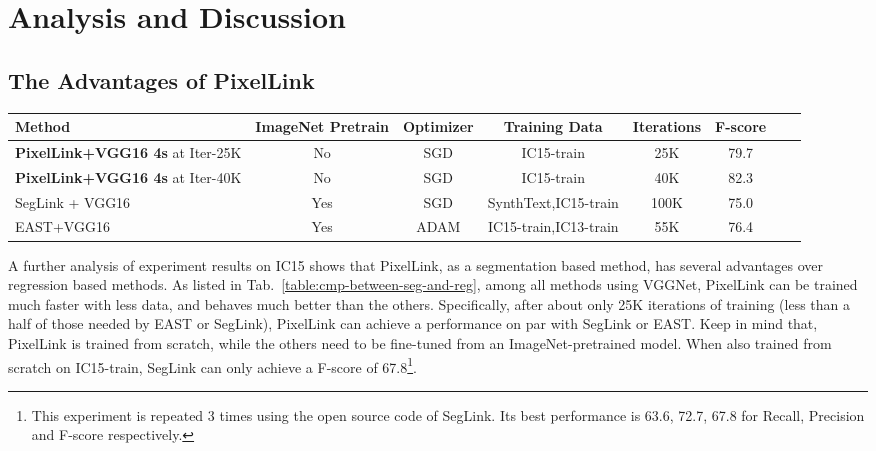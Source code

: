\documentclass[letterpaper]{article} \usepackage{aaai18}  \usepackage{times}  \usepackage{helvet}  \usepackage{courier}  \usepackage{url}  \usepackage{graphicx}
\begin{document}
	\section{Analysis and Discussion}
	\subsection{The Advantages of PixelLink}
	\label{sec:seg-vs-reg}
	\begin{table*}[!ht]
		\caption{Comparison of training speed and training data for IC15. SynthText~\cite{Gupta2016SynthText} is a synthetic dataset containing more than 0.8M images. All listed results for comparison are quoted from the corresponding original papers.}
		\label{table:cmp-between-seg-and-reg}
		\centering
		\begin{tabular}{|l|c|c|c|c|c|c|c|}
			\hline
			Method                          &ImageNet Pretrain  &Optimizer  &Training Data              &Iterations & F-score       \\
			\hline\hline
			\textbf{PixelLink+VGG16 4s} at Iter-25K  &No                     &SGD        &IC15-train                 &25K        &79.7   \\
			\hline
			\textbf{PixelLink+VGG16 4s} at Iter-40K  &No                     &SGD        &IC15-train                 &40K        &82.3   \\
			\hline
			SegLink + VGG16                 &Yes                    &SGD        &SynthText,IC15-train       &100K       &75.0   \\
			\hline
			EAST+VGG16                      &Yes                    &ADAM       &IC15-train,IC13-train      &55K             &76.4   \\
			\hline
		\end{tabular}
	\end{table*}
	A further analysis of experiment results on IC15 shows that PixelLink, as a segmentation based method, has several advantages over regression based methods.  As listed in  Tab.~\ref{table:cmp-between-seg-and-reg}, among all methods using VGGNet, PixelLink can be trained much faster with less data, and behaves much better than the others. Specifically, after about only 25K iterations of training (less than a half of those needed by EAST or SegLink), PixelLink can achieve a performance on par with SegLink or EAST. Keep in mind that, PixelLink is trained from scratch, while the others need to be fine-tuned from an ImageNet-pretrained model. When also trained from scratch on IC15-train, SegLink can only achieve a F-score of 67.8\footnote{This experiment is repeated  3 times using the open source code of SegLink. Its best performance is 63.6, 72.7, 67.8 for Recall, Precision and F-score respectively.}.
	
\end{document}
